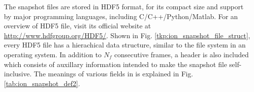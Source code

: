 \documentclass[10pt,a4paper]{article}
\begin{document}
The snapshot files are stored in HDF5 format, for its compact size and support by major programming languages, including C/C++/Python/Matlab. For an overview of HDF5 file, visit its official website at \url{http://www.hdfgroup.org/HDF5/}. Shown in Fig. \ref{tkp:ion_snapshot_file_struct}, every HDF5 file has a hierachical data structure, similar to the file system in an operating system. In addition to $N_f$ consecutive frames, a {} header is also included which consists of auxillary information intended to make the snapshot file self-inclusive. The meanings of various fields in {} is explained in Fig. \ref{tab:ion_snapshot_def2}.
\end{document}
